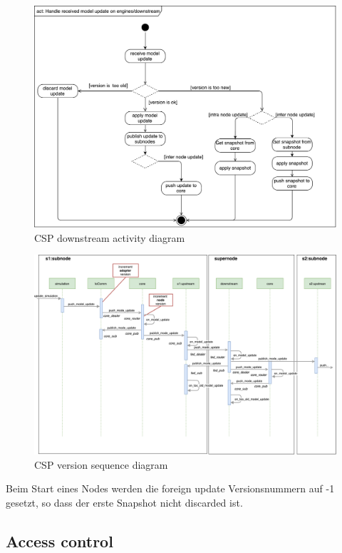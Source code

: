 \begin{figure}[]
	\includegraphics[width=\textwidth]{img/activity_diagram_downstream.pdf}
	\caption{CSP downstream activity diagram}
	\label{fig:csp:downstream:activty:diagram}
\end{figure}

\begin{figure}[]
	\includegraphics[width=\textwidth]{img/sequence_diagram_model_update_pub.pdf}
	\caption{CSP version sequence diagram}
	\label{fig:csp:version:sequence:diagram}
\end{figure}

Beim Start eines Nodes werden die foreign update Versionsnummern auf -1 gesetzt, so
dass der erste Snapshot nicht discarded ist.

\subsection{Access control}

